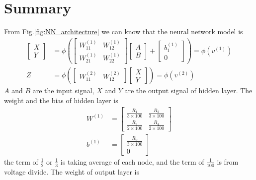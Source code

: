 \documentclass[a4paper, 12pt, AutoFakeBold]{report}
\newcommand{\figref}[1]{Fig.\ref{#1}}
\begin{document}
    \section{Summary}
    From \figref{fig:NN_architecture} we can know that the neural network model is
    \begin{align}
        \begin{bmatrix}
            X \\ Y
        \end{bmatrix} &=
        \phi\left(\begin{bmatrix}
            W_{11}^{(1)} & W_{12}^{(1)} \\
            W_{21}^{(1)} & W_{22}^{(1)}
        \end{bmatrix}
        \begin{bmatrix}
            A \\ B
        \end{bmatrix} +
        \begin{bmatrix}
            b^{(1)}_1 \\ 0
        \end{bmatrix}\right) =
        \phi\left(v^{(1)}\right) \\
        Z &=
        \phi\left(\begin{bmatrix}
            W_{11}^{(2)} & W_{12}^{(2)}
        \end{bmatrix}
        \begin{bmatrix}
            X \\ Y
        \end{bmatrix}\right) =
        \phi\left(v^{(2)}\right)
    \end{align}
    $A$ and $B$ are the input signal, $X$ and $Y$ are the output signal of hidden layer. The weight and the bias of hidden layer is
    \begin{align}
        W^{(1)} &=
        \begin{bmatrix}
            \frac{R_1}{3\times 100} & \frac{R_2}{3\times 100} \\
            \frac{R_3}{2\times 100} & \frac{R_4}{2\times 100}
        \end{bmatrix} \\
        b^{(1)} &=
        \begin{bmatrix}
            \frac{R_\text{b}}{3\times 100} \\ 0
        \end{bmatrix}
    \end{align}
    the term of $\frac{1}{2}$ or $\frac{1}{3}$ is taking average of each node, and the term of $\frac{1}{100}$ is from voltage divide. The weight of output layer is
\end{document}
